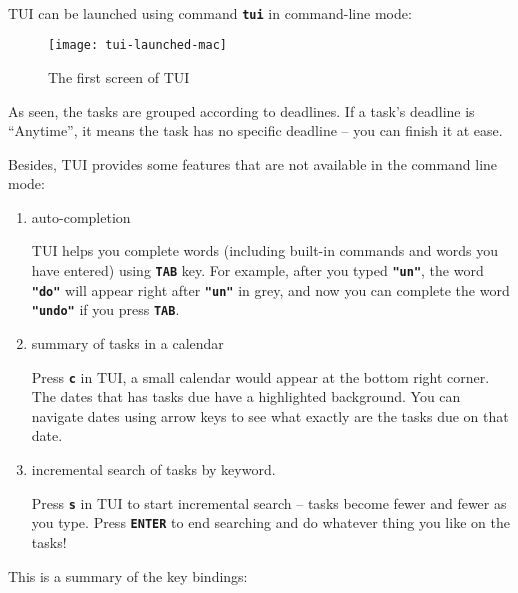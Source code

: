 \documentclass[12pt, a4paper]{article}
\newcommand{\cmdinline}[1]{{\bf \texttt{#1}}}
\begin{document}
\\TUI can be launched using command \cmdinline{tui} in command-line mode:

\begin{figure}[htbp]
  \centering
  \texttt{[image: tui-launched-mac]}
  \caption{The first screen of TUI}
\end{figure}

As seen, the tasks are grouped according to deadlines. If a task's deadline is ``Anytime'', it means the task has no specific deadline -- you can finish it at ease.

Besides, TUI provides some features that are not available in the command line mode:\begin{enumerate}
\item auto-completion

  TUI helps you complete words (including built-in commands and words you have entered) using \cmdinline{TAB} key. For example, after you typed \cmdinline{"un"}, the word \cmdinline{"do"} will appear right after \cmdinline{"un"} in grey, and now you can complete the word \cmdinline{"undo"} if you press \cmdinline{TAB}.
\item summary of tasks in a calendar

  Press \cmdinline{c} in TUI, a small calendar would appear at the bottom right corner. The dates that has tasks due have a highlighted background. You can navigate dates using arrow keys to see what exactly are the tasks due on that date.
\item incremental search of tasks by keyword.

  Press \cmdinline{s} in TUI to start incremental search -- tasks become fewer and fewer as you type. Press \cmdinline{ENTER} to end searching and do whatever thing you like on the tasks!
\end{enumerate}

This is a summary of the key bindings:\\
\end{document}
